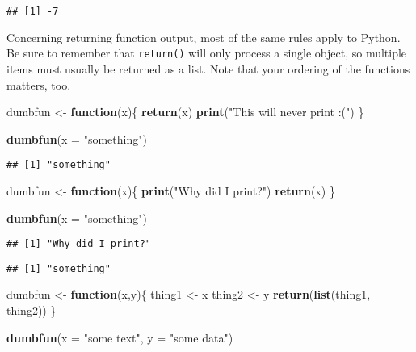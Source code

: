 \documentclass[
]{book}
\newenvironment{Shaded}{\begin{snugshade}}{\end{snugshade}}
\newcommand{\ControlFlowTok}[1]{\textcolor[rgb]{0.13,0.29,0.53}{\textbf{#1}}}
\newcommand{\DataTypeTok}[1]{\textcolor[rgb]{0.13,0.29,0.53}{#1}}
\newcommand{\KeywordTok}[1]{\textcolor[rgb]{0.13,0.29,0.53}{\textbf{#1}}}
\newcommand{\NormalTok}[1]{#1}
\newcommand{\StringTok}[1]{\textcolor[rgb]{0.31,0.60,0.02}{#1}}
\begin{document}
\begin{verbatim}
## [1] -7
\end{verbatim}

Concerning returning function output, most of the same rules apply to Python. Be sure to remember that \texttt{return()} will only process a single object, so multiple items must usually be returned as a list. Note that your ordering of the functions matters, too.

\begin{Shaded}
\begin{Highlighting}[]
\NormalTok{dumbfun \textless{}{-}}\StringTok{ }\ControlFlowTok{function}\NormalTok{(x)\{}
  \KeywordTok{return}\NormalTok{(x)}
  \KeywordTok{print}\NormalTok{(}\StringTok{"This will never print :("}\NormalTok{)}
\NormalTok{\}}

\KeywordTok{dumbfun}\NormalTok{(}\DataTypeTok{x =} \StringTok{"something"}\NormalTok{)}
\end{Highlighting}
\end{Shaded}

\begin{verbatim}
## [1] "something"
\end{verbatim}

\begin{Shaded}
\begin{Highlighting}[]
\NormalTok{dumbfun \textless{}{-}}\StringTok{ }\ControlFlowTok{function}\NormalTok{(x)\{}
  \KeywordTok{print}\NormalTok{(}\StringTok{"Why did I print?"}\NormalTok{)}
  \KeywordTok{return}\NormalTok{(x)}
\NormalTok{\}}

\KeywordTok{dumbfun}\NormalTok{(}\DataTypeTok{x =} \StringTok{"something"}\NormalTok{)}
\end{Highlighting}
\end{Shaded}

\begin{verbatim}
## [1] "Why did I print?"
\end{verbatim}

\begin{verbatim}
## [1] "something"
\end{verbatim}

\begin{Shaded}
\begin{Highlighting}[]
\NormalTok{dumbfun \textless{}{-}}\StringTok{ }\ControlFlowTok{function}\NormalTok{(x,y)\{}
\NormalTok{  thing1 \textless{}{-}}\StringTok{ }\NormalTok{x}
\NormalTok{  thing2 \textless{}{-}}\StringTok{ }\NormalTok{y}
  \KeywordTok{return}\NormalTok{(}\KeywordTok{list}\NormalTok{(thing1, thing2))}
\NormalTok{\}}

\KeywordTok{dumbfun}\NormalTok{(}\DataTypeTok{x =} \StringTok{"some text"}\NormalTok{, }\DataTypeTok{y =} \StringTok{"some data"}\NormalTok{)}
\end{Highlighting}
\end{Shaded}
\end{document}
